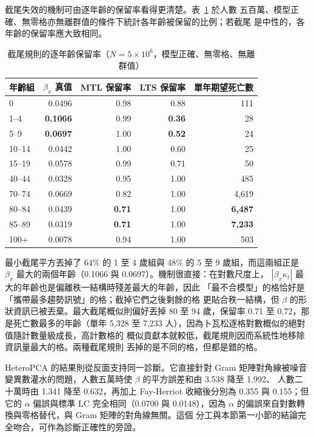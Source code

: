 \documentclass[UTF8, fontset=macnew, a4paper, 12pt]{ctexart}
\begin{document}
截尾失效的機制可由逐年齡的保留率看得更清楚。表~\ref{tab:retain} 於人數
五百萬、模型正確、無零格亦無離群值的條件下統計各年齡被保留的比例；若截尾
是中性的，各年齡的保留率應大致相同。

\begin{table}[H]
\centering
\caption{截尾規則的逐年齡保留率（$N=5\times10^6$，模型正確、無零格、無離群值）}
\small
\begin{tabular}{lrrrr}
\toprule
年齡組 & $\beta_x$ 真值 & MTL 保留率 & LTS 保留率 & 單年期望死亡數\\
\midrule
0        & 0.0496 & 0.98 & 0.88 & 111\\
1--4     & \textbf{0.1066} & 0.99 & \textbf{0.36} & \phantom{0,0}28\\
5--9     & \textbf{0.0697} & 1.00 & \textbf{0.52} & \phantom{0,0}24\\
10--14   & 0.0442 & 1.00 & 0.60 & \phantom{0,0}25\\
15--19   & 0.0578 & 0.99 & 0.71 & \phantom{0,0}50\\
40--44   & 0.0328 & 0.95 & 1.00 & \phantom{0,}485\\
70--74   & 0.0669 & 0.82 & 1.00 & 4,619\\
80--84   & 0.0439 & \textbf{0.71} & 1.00 & \textbf{6,487}\\
85--89   & 0.0319 & \textbf{0.71} & 1.00 & \textbf{7,233}\\
100$+$   & 0.0078 & 0.94 & 1.00 & \phantom{0,}503\\
\bottomrule
\end{tabular}
\label{tab:retain}
\end{table}

最小截尾平方丟掉了 64\% 的 1 至 4 歲組與 48\% 的 5 至 9 歲組，而這兩組正是
$\beta_x$ 最大的兩個年齡（0.1066 與 0.0697）。機制很直接：在對數尺度上，
$|\beta_x\kappa_t|$ 最大的年齡也是偏離秩一結構時殘差最大的年齡，因此
「最不合模型」的格恰好是「攜帶最多趨勢訊號」的格；截掉它們之後剩餘的格
更貼合秩一結構，但 $\beta$ 的形狀資訊已被丟棄。最大截尾概似則偏好丟掉
80 至 94 歲，保留率 0.71 至 0.72，那是死亡數最多的年齡（單年 5{,}328 至
7{,}233 人），因為卜瓦松逐格對數概似的絕對值隨計數量級成長，高計數格的
概似貢獻本就較低，截尾規則因而系統性地移除資訊量最大的格。兩種截尾規則
丟掉的是不同的格，但都是錯的格。

HeteroPCA 的結果則從反面支持同一診斷。它直接針對 Gram 矩陣對角線被噪音
變異數灌水的問題，人數五萬時使 $\beta$ 的平方誤差和由 3.538 降至 1.992、
人數二十萬時由 1.341 降至 0.632，再加上 Fay-Herriot 收縮後分別為 0.355 與
0.155；但它的 $\alpha$ 偏誤與標準 LC 完全相同（0.0700 與 0.0148），因為
$\alpha$ 的偏誤來自對數轉換與零格替代，與 Gram 矩陣的對角線無關。這個
分工與本節第一小節的結論完全吻合，可作為診斷正確性的旁證。
\end{document}
